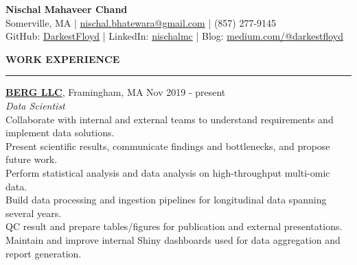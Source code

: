 \documentclass[a4paper]{article}
\newcommand{\myline}{\par
  \kern2pt %
  \hrule height 0.5pt
  \kern2pt %
}
\newcommand{\mybullet}{
	\indent 
  \textbullet \hspace*{2mm}
}
\begin{document}
	\begin{center}
		{\LARGE \textbf{Nischal Mahaveer Chand}} \\
    Somerville, MA | 
    \href{mailto:nischal.bhatewara@gmail.com}{nischal.bhatewara@gmail.com} | 
    (857) 277-9145 \\
                GitHub: \href{https://github.com/darkestfloyd}{DarkestFloyd} | 
                LinkedIn: \href{https://www.linkedin.com/in/nischalmc}{nischalmc} |
		Blog: \href{https://medium.com/@darkestfloyd}{medium.com/@darkestfloyd} \\
	\end{center}
	


	\smallskip
	\smallskip
	\noindent
	{\large \textbf{WORK EXPERIENCE}}
	\myline 
	\smallskip
	
  \noindent
  \textbf{\href{https://www.berghealth.com/}{BERG LLC}}, Framingham, MA
  \hfill Nov 2019 - present \\
  \textit{Data Scientist} \\
  \mybullet Collaborate with internal and external teams to understand requirements and 
    implement data solutions. \\
  \mybullet Present scientific results, communicate findings and bottlenecks, and propose future work. \\
  \mybullet Perform statistical analysis and data analysis on high-throughput multi-omic data. \\
  \mybullet Build data processing and ingestion pipelines for longitudinal data spanning several years. \\
  \mybullet QC result and prepare tables/figures for publication and external presentations. \\
  \mybullet Maintain and improve internal Shiny dashboards used for data aggregation and report generation. \\
\end{document}
